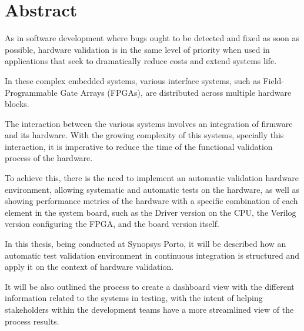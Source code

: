 \chapter*{Abstract}

As in software development where bugs ought to be detected and fixed as soon as possible, hardware validation is in the same level of priority when used in applications that seek to dramatically reduce costs and extend systems life.

In these complex embedded systems, various interface systems, such as Field-Programmable Gate Arrays (FPGAs), are distributed across multiple hardware blocks. 

The interaction between the various systems involves an integration of firmware and its hardware.
With the growing complexity of this systems, specially this interaction, it is imperative to reduce the time of the functional validation process of the hardware.

To achieve this, there is the need to implement an automatic validation hardware environment, allowing systematic and automatic tests on the hardware, as well as showing performance metrics of the hardware with a specific combination of each element in the system board, such as the Driver version on the CPU, the Verilog version configuring the FPGA, and the board version itself.

In this thesis, being conducted at Synopsys Porto, it will be described how an automatic test validation environment in continuous integration is structured and apply it on the context of hardware validation. 

It will be also outlined the process to create a dashboard view with the different information related to the systems in testing, with the intent of helping stakeholders within the development teams have a more streamlined view of the process results.




